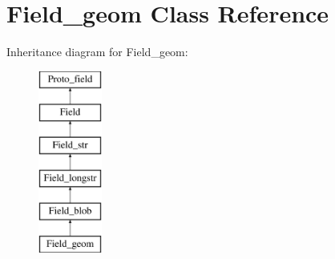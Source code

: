 \hypertarget{classField__geom}{}\section{Field\+\_\+geom Class Reference}
\label{classField__geom}
Inheritance diagram for Field\+\_\+geom\+:\begin{figure}[H]
\begin{center}
\leavevmode
\includegraphics[height=6.000000cm]{classField__geom}
\end{center}
\end{figure}
